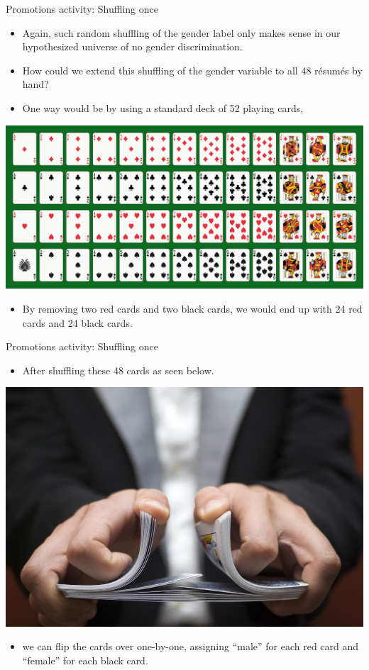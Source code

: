 \documentclass[
  ignorenonframetext,
]{beamer}
\providecommand{\tightlist}{%
  \setlength{\itemsep}{0pt}\setlength{\parskip}{0pt}}
\begin{document}
\begin{frame}{Promotions activity: Shuffling once}
\protect\hypertarget{promotions-activity-shuffling-once-2}{}
\begin{itemize}
\item
  Again, such random shuffling of the gender label only makes sense in
  our hypothesized universe of no gender discrimination.
\item
  How could we extend this shuffling of the gender variable to all 48
  résumés by hand?
\item
  One way would be by using a standard deck of 52 playing cards,
\end{itemize}

\begin{center}\includegraphics[width=0.7\linewidth,height=0.4\textheight]{week12_2} \end{center}

\begin{itemize}
\tightlist
\item
  By removing two red cards and two black cards, we would end up with 24
  red cards and 24 black cards.
\end{itemize}
\end{frame}

\begin{frame}{Promotions activity: Shuffling once}
\protect\hypertarget{promotions-activity-shuffling-once-3}{}
\begin{itemize}
\tightlist
\item
  After shuffling these 48 cards as seen below.
\end{itemize}

\begin{center}\includegraphics[width=0.7\linewidth,height=0.4\textheight]{week12_3} \end{center}

\begin{itemize}
\tightlist
\item
  we can flip the cards over one-by-one, assigning ``male'' for each red
  card and ``female'' for each black card.
\end{itemize}
\end{frame}
\end{document}
